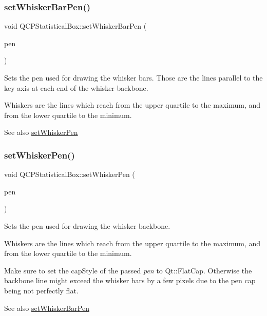 \subsubsection{\texorpdfstring{setWhiskerBarPen()}{setWhiskerBarPen()}}
{\footnotesize\ttfamily void Q\+C\+P\+Statistical\+Box\+::set\+Whisker\+Bar\+Pen (\begin{DoxyParamCaption}\item[{const Q\+Pen \&}]{pen }\end{DoxyParamCaption})}

Sets the pen used for drawing the whisker bars. Those are the lines parallel to the key axis at each end of the whisker backbone.

Whiskers are the lines which reach from the upper quartile to the maximum, and from the lower quartile to the minimum.

\begin{DoxySeeAlso}{See also}
\mbox{\hyperlink{class_q_c_p_statistical_box_a4a5034cb3b9b040444df05ab1684620b}{set\+Whisker\+Pen}} 
\end{DoxySeeAlso}
\mbox{\label{class_q_c_p_statistical_box_a4a5034cb3b9b040444df05ab1684620b}} 
\subsubsection{\texorpdfstring{setWhiskerPen()}{setWhiskerPen()}}
{\footnotesize\ttfamily void Q\+C\+P\+Statistical\+Box\+::set\+Whisker\+Pen (\begin{DoxyParamCaption}\item[{const Q\+Pen \&}]{pen }\end{DoxyParamCaption})}

Sets the pen used for drawing the whisker backbone.

Whiskers are the lines which reach from the upper quartile to the maximum, and from the lower quartile to the minimum.

Make sure to set the {\ttfamily cap\+Style} of the passed {\itshape pen} to {\ttfamily Qt\+::\+Flat\+Cap}. Otherwise the backbone line might exceed the whisker bars by a few pixels due to the pen cap being not perfectly flat.

\begin{DoxySeeAlso}{See also}
\mbox{\hyperlink{class_q_c_p_statistical_box_aa8d3e503897788e1abf68dc74b5f147f}{set\+Whisker\+Bar\+Pen}} 
\end{DoxySeeAlso}
\mbox{\label{class_q_c_p_statistical_box_adf378812446bd66f34d1f7f293d991cd}} 

